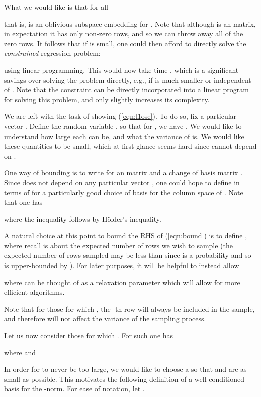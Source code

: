 \documentclass[11pt]{article}
\begin{document}
What we would like is that for all 

that is, 
 is an oblivious subspace embedding for . Note that although  is an 
matrix, in expectation it has only  non-zero rows, and so we can throw away
all of the zero rows. It follows that if  is small,
one could then afford to directly solve the {\it constrained} regression problem:

using linear programming. This would now take time , which is a significant savings over
solving the problem directly, e.g., if  is much smaller or independent of . Note that the constraint
 can be directly incorporated into a linear program for solving this problem, and only
slightly increases its complexity. 

We are left with the task of showing (\ref{eqn:l1ose}). To do so, fix a particular vector
. Define the random variable , so that for ,
we have . We would like to understand how large each  can be, and
what the variance of  is. We would like these quantities to be small, which at first glance
seems hard since  cannot depend on . 

One way of bounding  is to write  for an  matrix  and
a  change of basis matrix . Since  does not depend on any particular
vector , one could hope to define  in terms of  for a particularly good choice of basis
 for the column space of . Note that one has

where the inequality follows by H\"older's inequality. 

A natural choice at this point to bound the RHS of (\ref{eqn:bound}) is to define
, where recall  is about the expected
number of rows we wish to sample (the expected number of rows sampled may be less than  since  is a 
probability and so is upper-bounded by ). For later purposes, it will be helpful to instead
allow 
 
where 
can be thought of as a relaxation parameter which will allow for more
efficient algorithms. 

Note that for those  for which 
, 
the -th row  will always be included
in the sample, and therefore will not affect the variance of the sampling process. 

Let us now consider those  for which 
. For such  
one has

where  and 

In order for  to never be too large, 
we would like to choose a  so that  and  are as small as possible. This
motivates the following definition of a well-conditioned basis for the -norm. For ease of notation,
let . 
\end{document}
